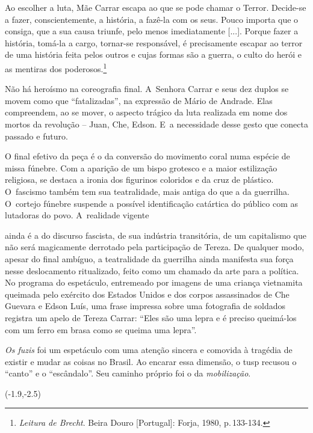 {\startblockquote
Ao escolher a luta, Mãe Carrar escapa ao que se pode chamar o Terror.
Decide-se a fazer, conscientemente, a história, a fazê-la com os seus.
Pouco importa que o consiga, que a sua causa triunfe, pelo menos
imediatamente {[}...{]}. Porque fazer a história, tomá-la a cargo,
tornar-se responsável, é precisamente escapar ao terror de uma história
feita pelos outros e cujas formas são a guerra, o culto do herói e as
mentiras dos poderosos.\footnote{{\it Leitura de Brecht}. Beira Douro
  {[}Portugal{]}: Forja, 1980, p.\,133-134.}
\stopblockquote

Não há heroísmo na coreografia final. A~Senhora Carrar e seus dez duplos
se movem como que “fatalizadas”, na expressão de Mário de Andrade. Elas
compreendem, ao se mover, o aspecto trágico da luta realizada em nome
dos mortos da revolução -- Juan, Che, Edson. E~a necessidade desse gesto
que conecta passado e futuro.

O final efetivo da peça é o da conversão do movimento coral numa espécie
de missa fúnebre. Com a aparição de um bispo grotesco e a maior
estilização religiosa, se destaca a ironia dos figurinos coloridos e da
cruz de plástico. O~fascismo também tem sua teatralidade, mais antiga do
que a da guerrilha. O~cortejo fúnebre suspende a possível identificação
catártica do público com as lutadoras do povo. A~realidade vigente

\column

\noindent{}ainda
é a do discurso fascista, de sua indústria transitória, de um
capitalismo que não será magicamente derrotado pela participação de
Tereza. De qualquer modo, apesar do final ambíguo, a teatralidade da
guerrilha ainda manifesta sua força nesse deslocamento ritualizado,
feito como um chamado da arte para a política. No programa do
espetáculo, entremeado por imagens de uma criança vietnamita queimada
pelo exército dos Estados Unidos e dos corpos assassinados de Che
Guevara e Edson Luís, uma frase impressa sobre uma fotografia de
soldados registra um apelo de Tereza Carrar: “Eles são uma lepra e é
preciso queimá-los com um ferro em brasa como se queima uma lepra”.

{\it Os fuzis} foi um espetáculo com uma atenção sincera e comovida à
tragédia de existir e mudar as coisas no Brasil. Ao encarar essa
dimensão, o {\sc tusp} recusou o “canto” e o “escândalo”. Seu caminho próprio
foi o da {\it mobilização}.

\startpositioning
   \position(-1.9,-2.5){}
\stoppositioning   

}
